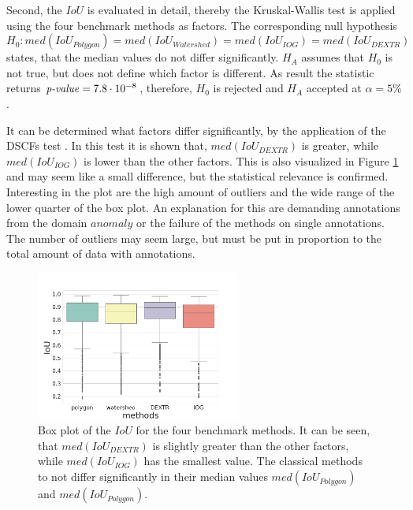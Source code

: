 Second, the $ IoU $ is evaluated in detail, thereby the Kruskal-Wallis test is applied using the four benchmark methods as factors.
The corresponding null hypothesis 
\begin{equation}
	H_{0}: med \left( IoU_{Polygon} \right) = med \left( IoU_{Watershed} \right) = med \left( IoU_{IOG} \right) = med \left( IoU_{DEXTR} \right)
\end{equation}
states, that the median values do not differ significantly.
$ H_{A} $ assumes that $ H_{0} $ is not true, but does not define which factor is different.
As result the statistic returns $ \textnormal{\textit{p-value}} = 7.8 \cdot 10 ^{-8} $, therefore, $ H_{0} $ is rejected and $ H_{A} $ accepted at $ \alpha=5\% $.

It can be determined what factors differ significantly, by the application of the DSCFs  test \cite{CF91-dscf}.
In this test it is shown that, $ med \left( IoU_{DEXTR} \right) $ is greater, while $ med \left( IoU_{IOG} \right) $ is lower than the other factors. 
This is also visualized in Figure \ref{fig:ch5:sec1:iou_box_plot} and may seem like a small difference, but the statistical relevance is confirmed.
Interesting in the plot are the high amount of outliers and the wide range of the lower quarter of the box plot.
An explanation for this are demanding annotations from the domain $ anomaly $ or the failure of the methods on single annotations.
The number of outliers may seem large, but must be put in proportion to the total amount of data with \getNumberBenchmarkAnnotations annotations.

\begin{figure}
	\centering
	\includegraphics[width=0.6\textwidth]{figures/chap51_iou_boxplot.png}
	\caption[Box plots method on $ IoU $]{
		Box plot of the $ IoU $ for the four benchmark methods.
		It can be seen, that $ med \left( IoU_{DEXTR} \right) $ is slightly greater than the other factors, while $ med \left( IoU_{IOG} \right) $ has the smallest value.
		The classical methods to not differ significantly in their median values $ med \left( IoU_{Polygon} \right) $ and $ med \left( IoU_{Polygon} \right) $.
	} \label{fig:ch5:sec1:iou_box_plot}
\end{figure}


